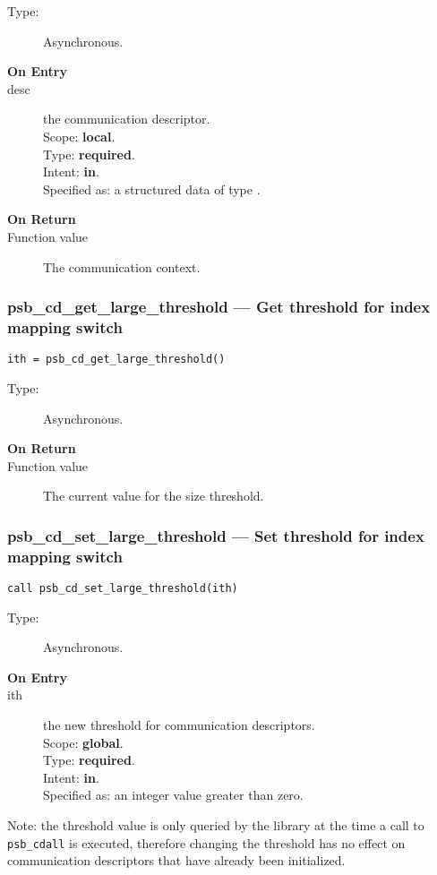 \begin{description}
\item[Type:] Asynchronous.
\item[\bf On Entry]
\item[desc] the communication descriptor.\\
Scope: {\bf local}.\\
Type: {\bf required}.\\
Intent: {\bf in}.\\
Specified as: a structured data of type \descdata.
\end{description}

\begin{description}
\item[\bf On Return]
\item[Function value] The communication context.
\end{description}


\subsubsection*{psb\_cd\_get\_large\_threshold --- Get threshold for
  index mapping switch}
\begin{verbatim}
ith = psb_cd_get_large_threshold()
\end{verbatim}

\begin{description}
\item[Type:] Asynchronous.
\item[\bf On Return]
\item[Function value] The current value for the size threshold. 

\end{description}



\subsubsection*{psb\_cd\_set\_large\_threshold --- Set threshold for
  index mapping switch}
\begin{verbatim}
call psb_cd_set_large_threshold(ith)
\end{verbatim}

\begin{description}
\item[Type:] Asynchronous.
\item[\bf On Entry]
\item[ith] the new threshold for communication descriptors.\\
Scope: {\bf global}.\\
Type: {\bf required}.\\
Intent: {\bf in}.\\
Specified as: an integer value greater than zero.
\end{description}
Note: the threshold value is only queried by the library at the time a
call to \verb|psb_cdall| is executed, therefore changing the threshold
has no effect on communication descriptors that have already been initialized.

